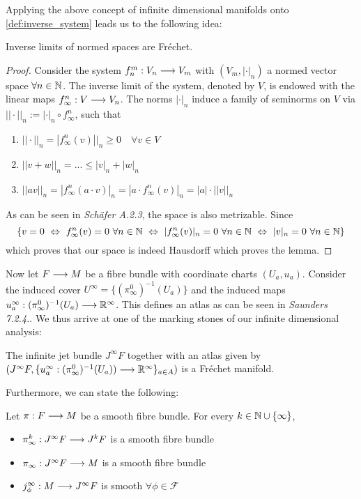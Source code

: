 Applying the above concept of infinite dimensional manifolds onto \ref{def:inverse_system} leads us to the following idea:

\begin{lem}
  Inverse limits of normed spaces are Fréchet.
\begin{proof}
  Consider the system $f^m_n: V_n \longrightarrow V_m$ with $(V_m, |\cdot |_n)$ a normed vector space $\forall n\in \mathbb{N}$. The inverse limit of the system, denoted by $V$, is endowed with the linear maps $f^n_\infty: V  \longrightarrow V_n$. The norms $|\cdot|_n$ induce a family of seminorms on $V$ via $||\cdot ||_n := |\cdot |_n \circ f^n_\infty$, such that
  \begin{enumerate}
    \item $||\cdot ||_n = |f^n_\infty(v)||_n \geq 0 \quad \forall v \in V$

    \item $||v+w||_n = ... \leq |v|_n + |w|_n$

    \item $||av||_n = |f^n_\infty(a\cdot v)|_n = |a\cdot f^n_\infty(v)|_n = |a| \cdot ||v||_n$
  \end{enumerate}
  As can be seen in \emph{Schäfer A.2.3}, the space is also metrizable. Since
  $$ \{v = 0 \ \Leftrightarrow \ f^n_\infty(v) = 0 \ \forall n \in \NN \ \Leftrightarrow \ |f^n_\infty(v)|_n = 0 \ \forall n \in \NN \ \Leftrightarrow \ |v|_n = 0 \ \forall n \in \NN \}  $$
  which proves that our space is indeed Hausdorff which proves the lemma.
\end{proof}
\end{lem}

Now let $F\longrightarrow M$ be a fibre bundle with coordinate charts $(U_a, u_a)$. Consider the induced cover $U^\infty = \{ (\pi^0_\infty)^{-1}(U_a) \}$ and the induced maps $u^\infty_a: (\pi^0_\infty)^{-1}(U_a) \longrightarrow \mathbb{R}^\infty$. This defines an atlas as can be seen in \emph{Saunders 7.2.4.}. We thus arrive at one of the marking stones of our infinite dimensional analysis:

\begin{prop}
  The infinite jet bundle $J^\infty F$ together with an atlas given by $(J^\infty F, \{u^\infty_a:(\pi^0_\infty)^{-1}(U_a))\longrightarrow \mathbb{R}^\infty\}_{a\in A})$ is a Fréchet manifold.
\end{prop}

Furthermore, we can state the following:

\begin{prop}
  Let $\pi:F\longrightarrow M$ be a smooth fibre bundle. For every $k \in \mathbb{N} \cup \{\infty\}$,
  \begin{itemize}
    \item $\pi^k_\infty: J^\infty F \longrightarrow J^k F$ is a smooth fibre bundle
    \item $\pi_\infty: J^\infty F \longrightarrow M$ is a smooth fibre bundle
    \item $j_\phi^\infty: M \lra J^\infty F$ is smooth $\forall \phi \in \mathcal{F}$
  \end{itemize}
\end{prop}

